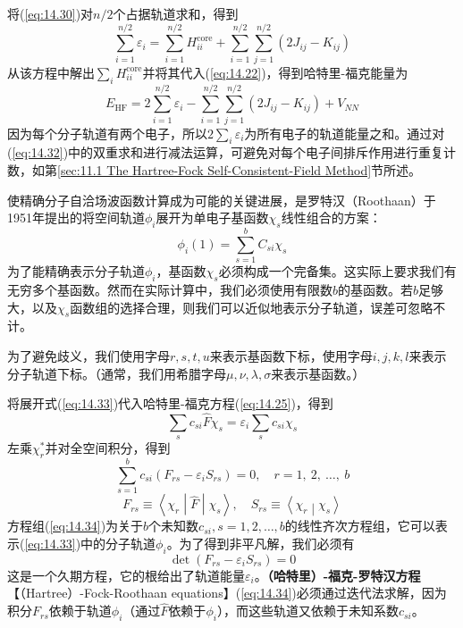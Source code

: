     将(\ref{eq:14.30})对$n/2$个占据轨道求和，得到
    \begin{equation}
        \sum_{i=1}^{n/2} \varepsilon_i = \sum_{i=1}^{n/2} H^{\text{core}}_{ii} + \sum_{i=1}^{n/2} \sum_{j=1}^{n/2} \left(2J_{ij} - K_{ij}\right)
        \label{eq:14.31}
    \end{equation}
    从该方程中解出$\sum_i H^{\text{core}}_{ii}$并将其代入(\ref{eq:14.22})，得到哈特里-福克能量为
    \begin{equation}
        E_{\text{HF}} = 2\sum_{i=1}^{n/2} \varepsilon_i - \sum_{i=1}^{n/2} \sum_{j=1}^{n/2} \left(2J_{ij} - K_{ij}\right) + V_{NN}
        \label{eq:14.32}
    \end{equation}
    因为每个分子轨道有两个电子，所以$2\sum_i \varepsilon_i$为所有电子的轨道能量之和。通过对(\ref{eq:14.32})中的双重求和进行减法运算，可避免对每个电子间排斥作用进行重复计数，如第\ref{sec:11.1 The Hartree-Fock Self-Consistent-Field Method}节所述。

    使精确分子自洽场波函数计算成为可能的关键进展，是罗特汉（Roothaan）于1951年提出的将空间轨道$\phi_i$展开为单电子基函数$\chi_s$线性组合的方案：
    \begin{equation}
        \phi_i\left(1\right) = \sum_{s=1}^{b} C_{si} \chi_s
        \label{eq:14.33}
    \end{equation}
    为了能精确表示分子轨道$\phi_i$，基函数$\chi_s$必须构成一个完备集。这实际上要求我们有无穷多个基函数。然而在实际计算中，我们必须使用有限数$b$的基函数。若$b$足够大，以及$\chi_s$函数组的选择合理，则我们可以近似地表示分子轨道，误差可忽略不计。

    为了避免歧义，我们使用字母$r,s,t,u$来表示基函数下标，使用字母$i,j,k,l$来表示分子轨道下标。（通常，我们用希腊字母$\mu,\nu,\lambda,\sigma$来表示基函数。）

    将展开式(\ref{eq:14.33})代入哈特里-福克方程(\ref{eq:14.25})，得到
    \begin{equation*}
        \sum_s c_{si} \hat{F} \chi_s = \varepsilon_i \sum_s c_{si} \chi_s
    \end{equation*}
    左乘$\chi_r^*$并对全空间积分，得到
    \begin{equation}
        \sum_{s=1}^{b} c_{si} \left(F_{rs} - \varepsilon_i S_{rs}\right) = 0, \quad r = 1,\:2,\:\ldots,\:b
        \label{eq:14.34}
    \end{equation}
    \begin{equation}
        F_{rs} \equiv \left\langle \chi_r \middle| \hat{F} \middle| \chi_s \right\rangle, \quad S_{rs} \equiv \left\langle \chi_r \middle| \chi_s \right\rangle
        \label{eq:14.35}
    \end{equation}
    方程组(\ref{eq:14.34})为关于$b$个未知数$c_{si}, s = 1, 2, \ldots, b$的线性齐次方程组，它可以表示(\ref{eq:14.33})中的分子轨道$\phi_i$。为了得到非平凡解，我们必须有
    \begin{equation}
        \det \left(F_{rs} - \varepsilon_i S_{rs}\right) = 0
        \label{eq:14.36}
    \end{equation}
    这是一个久期方程，它的根给出了轨道能量$\varepsilon_i$。\textbf{（哈特里）-福克-罗特汉方程}【（Hartree）-Fock-Roothaan equations】(\ref{eq:14.34})必须通过迭代法求解，因为积分$F_{rs}$依赖于轨道$\phi_i$（通过$\hat{F}$依赖于$\phi_i$），而这些轨道又依赖于未知系数$c_{si}$。

